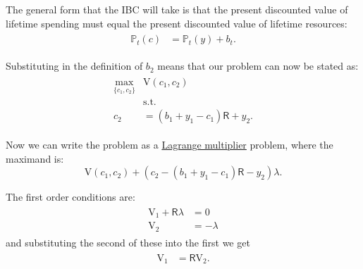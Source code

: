 \documentclass{scrartcl}
\begin{document}
  The general form that the IBC will take is that the present discounted value of lifetime spending must equal the present discounted value of lifetime resources:
  \begin{equation}\begin{gathered}\begin{aligned} {\mathbb{P}}_{t}(\boldsymbol{\mathit{c}}) & = {\mathbb{P}}_{t}(y)+\boldsymbol{\mathit{b}}_{t}. \label{eq:ibcgen}
      \end{aligned}\end{gathered}\end{equation}

  Substituting in the definition of $\boldsymbol{\mathit{b}}_{2}$ means that our problem can now be stated as:
  \begin{equation}\begin{gathered}\begin{aligned} \max_{\{\boldsymbol{\mathit{c}}_{1},\boldsymbol{\mathit{c}}_{2}\}} & \mathrm{V}(\boldsymbol{\mathit{c}}_{1},\boldsymbol{\mathit{c}}_{2}) \\ & \mbox{s.t.}  \nonumber \\ \boldsymbol{\mathit{c}}_{2} & = (\boldsymbol{\mathit{b}}_{1}+\boldsymbol{\mathit{y}}_{1}-\boldsymbol{\mathit{c}}_{1})\mathsf{R}+\boldsymbol{\mathit{y}}_{2}.
      \end{aligned}\end{gathered}\end{equation}

  Now we can write the problem as a \href{https://en.wikipedia.org/wiki/Lagrange_multiplier}{Lagrange multiplier} problem, where the maximand is:
  \begin{equation} \mathrm{V}(\boldsymbol{\mathit{c}}_{1},\boldsymbol{\mathit{c}}_{2}) + \left( \boldsymbol{\mathit{c}}_{2}- (\boldsymbol{\mathit{b}}_{1}+\boldsymbol{\mathit{y}}_{1}-\boldsymbol{\mathit{c}}_{1})\mathsf{R}-\boldsymbol{\mathit{y}}_{2}\right)\lambda.
  \end{equation}

  The first order conditions are:
  \begin{equation}\begin{gathered}\begin{aligned} \mathrm{V}_{1} + \mathsf{R}\lambda & = 0 \label{eq:lagrange1} \\ \mathrm{V}_{2} & = -\lambda
      \end{aligned}\end{gathered}\end{equation} and substituting the second of these into the first we get
  \begin{equation}\begin{gathered}\begin{aligned} \mathrm{V}_{1} & = \mathsf{R} \mathrm{V}_{2} \label{eq:timeprice}.
      \end{aligned}\end{gathered}\end{equation}
\end{document}
